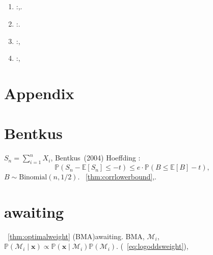 \documentclass[11pt,a4paper]{article}
\newcommand{\E}{\mathbb{E}}
\renewcommand{\P}{\mathbb{P}}
\newcommand{\xv}{\mathbf{x}}
\begin{document}
\subsection{}
\begin{enumerate}[label=(\arabic*)]
 \item :,.
 \item :.
 \item :, 
 \item :, 
\end{enumerate}
\section*{Appendix}
\appendix
\section{Bentkus}
 $S_n = \sum_{i=1}^n X_i$, Bentkus~(2004) Hoeffding : 
\begin{equation}
 \P(S_n - \E[S_n] \leq -t) \leq e \cdot \P(B \leq \E[B] - t),
\end{equation}
 $B \sim \text{Binomial}(n, 1/2)$.
~\ref{thm:corrlowerbound},.
\section{awaiting}
~\ref{thm:optimalweight} (BMA)awaiting.
 BMA, $\mathcal{M}_i$, 
 $\P(\mathcal{M}_i \mid \xv) \propto \P(\xv \mid \mathcal{M}_i) \P(\mathcal{M}_i)$.
(~\ref{eq:logoddsweight}), 
\end{document}
